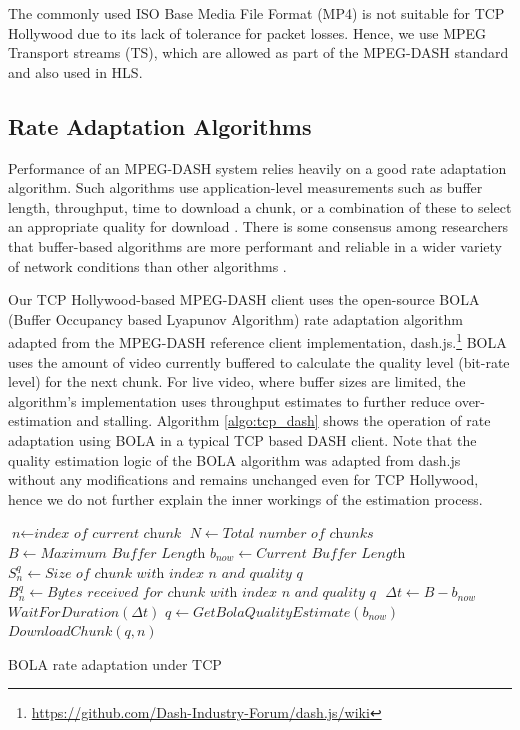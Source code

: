 The commonly used ISO Base Media File Format (MP4) is not suitable for TCP Hollywood due to its lack of tolerance for packet losses. Hence, we use MPEG Transport streams (TS), which are allowed as part of the MPEG-DASH standard and also used in HLS.

\subsection{Rate Adaptation Algorithms}

Performance of an MPEG-DASH system relies heavily on a good rate adaptation algorithm.
Such algorithms use application-level measurements such as buffer length, throughput, time to
download a chunk, or a combination of these to select an appropriate quality for
download \cite{beben2016abma+, spiteri2016bola, li2014probe}. There is some consensus
among researchers that buffer-based algorithms are more performant and reliable in a wider
variety of network conditions than other algorithms 
\cite{huang2015buffer, karagkioules2017comparative}.

Our TCP Hollywood-based MPEG-DASH client uses the open-source BOLA 
(Buffer Occupancy based Lyapunov Algorithm) rate adaptation algorithm \cite{spiteri2016bola} adapted from the MPEG-DASH reference
client implementation, dash.js.\footnote{\url{https://github.com/Dash-Industry-Forum/dash.js/wiki}}
BOLA uses the amount of video currently buffered to calculate the quality level (bit-rate
level) for the next chunk. For live video, where buffer sizes are limited, the algorithm's implementation 
uses throughput estimates to further reduce over-estimation and stalling. Algorithm \ref{algo:tcp_dash} shows the operation of rate adaptation using BOLA in a typical TCP based DASH client. Note that the quality estimation logic of the BOLA algorithm was adapted from dash.js without any modifications and remains unchanged even for TCP Hollywood, hence we do not further explain the inner workings of the estimation process. 


\begin{algorithm}[t!]
	\begin{algorithmic}[1]
		\State $\textit{n} \gets \textit{index of current chunk}$
		\State $N \gets \textit{Total number of chunks}$
		\State $B \gets \textit{Maximum Buffer Length}$
		\State $b_{now} \gets \textit{Current Buffer Length}$
		\State $S_n^q \gets \textit{Size of chunk with index n and quality q}$
		\State $B_n^q  \gets \textit{Bytes received for chunk with index n and quality q }$
				\State $\Delta t \gets B - b_{now}$
				\State $WaitForDuration (\Delta t)$
			\EndIf
			\State ${q \gets GetBolaQualityEstimate(b_{now})}$
			\State ${DownloadChunk(q, n)}$
		\EndWhile
		\EndProcedure
	\end{algorithmic}
	\caption{BOLA rate adaptation under TCP}
    	\label{algo:tcp_dash}
\end{algorithm}

